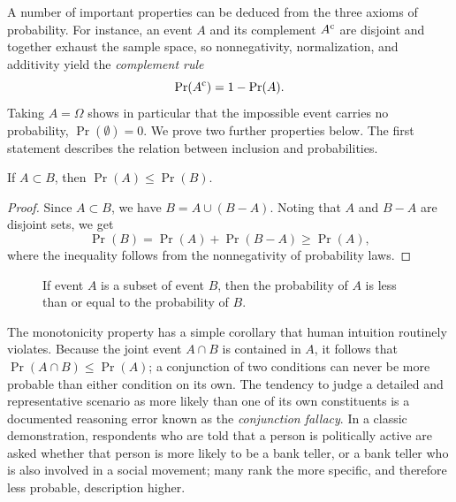 A number of important properties can be deduced from the three axioms of probability.
For instance, an event $A$ and its complement $A^{\mathrm{c}}$ are disjoint and together exhaust the sample space, so nonnegativity, normalization, and additivity yield the \emph{complement rule}
\begin{equation*}
\Pr (A^{\mathrm{c}}) = 1 - \Pr (A) .
\end{equation*}
Taking $A = \Omega$ shows in particular that the impossible event carries no probability, $\Pr (\emptyset) = 0$.
We prove two further properties below.
The first statement describes the relation between inclusion and probabilities.
\begin{proposition}
If $A \subset B$, then $\Pr (A) \leq \Pr (B)$.
\end{proposition}
\begin{proof}
Since $A \subset B$, we have $B = A \cup (B - A)$.
Noting that $A$ and $B - A$ are disjoint sets, we get
\begin{equation*}
\Pr (B) = \Pr (A) + \Pr (B - A) \geq \Pr (A) ,
\end{equation*}
where the inequality follows from the nonnegativity of probability laws.
\end{proof}
\begin{figure}[htb!]
\begin{center}
\caption{If event $A$ is a subset of event $B$, then the probability of $A$ is less than or equal to the probability of $B$.}
\end{center}
\end{figure}

The monotonicity property has a simple corollary that human intuition routinely violates.
Because the joint event $A \cap B$ is contained in $A$, it follows that $\Pr (A \cap B) \leq \Pr (A)$;
a conjunction of two conditions can never be more probable than either condition on its own.
The tendency to judge a detailed and representative scenario as more likely than one of its own constituents is a documented reasoning error known as the \emph{conjunction fallacy}.
In a classic demonstration, respondents who are told that a person is politically active are asked whether that person is more likely to be a bank teller, or a bank teller who is also involved in a social movement;
many rank the more specific, and therefore less probable, description higher.

